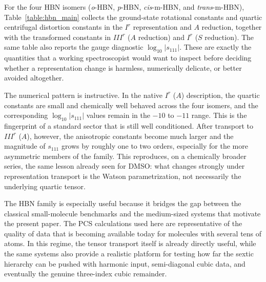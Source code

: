 For the four HBN isomers (\emph{o}-HBN, \emph{p}-HBN, \emph{cis}-m-HBN, and
\emph{trans}-m-HBN), Table~\ref{table:hbn_main} collects the ground-state
rotational constants and quartic centrifugal distortion constants in the
$I^r$ representation and $A$ reduction, together with the transformed
constants in $III^r$ ($A$ reduction) and $I^r$ ($S$ reduction). The same table
also reports the gauge diagnostic $\log_{10}|s_{111}|$. These are exactly the
quantities that a working spectroscopist would want to inspect before deciding
whether a representation change is harmless, numerically delicate, or better
avoided altogether.

The numerical pattern is instructive. In the native $I^r$ ($A$) description,
the quartic constants are small and chemically well behaved across the four
isomers, and the corresponding $\log_{10}|s_{111}|$ values remain in the
$-10$ to $-11$ range. This is the fingerprint of a standard sector that is
still well conditioned. After transport to $III^r$ ($A$), however, the
anisotropic constants become much larger and the magnitude of $s_{111}$ grows
by roughly one to two orders, especially for the more asymmetric members of
the family. This reproduces, on a chemically broader series, the same lesson
already seen for DMSO: what changes strongly under representation transport is
the Watson parametrization, not necessarily the underlying quartic tensor.

The HBN family is especially useful because it bridges the gap between the
classical small-molecule benchmarks and the medium-sized systems that motivate
the present paper. The PCS calculations used here are representative of the
quality of data that is becoming available today for molecules with several
tens of atoms. In this regime, the tensor transport itself is already directly
useful, while the same systems also provide a realistic platform for testing
how far the sextic hierarchy can be pushed with harmonic input, semi-diagonal
cubic data, and eventually the genuine three-index cubic remainder.

